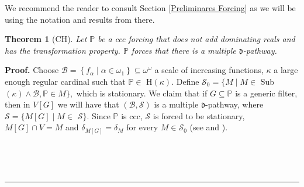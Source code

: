 \documentclass{article}%
\newtheorem{theorem}{Theorem}
\newenvironment{proof}[1][Proof]{\noindent\textbf{#1.} }{\ \rule{0.5em}{0.5em}}
\begin{document}
We recommend the reader to consult Section \ref{Preliminares Forcing} as we
will be using the notation and results from there.

\begin{theorem}
[\textsf{CH}]Let $\mathbb{P}$ be a ccc forcing that does not add dominating
reals and has the transformation property. $\mathbb{P}$ forces that there is a
multiple $\mathfrak{d}$-pathway.
\end{theorem}

\begin{proof}
Choose $\mathcal{B}=\left\{  f_{\alpha}\mid\alpha\in\omega_{1}\right\}
\subseteq\omega^{\omega}$ a scale of increasing functions, $\kappa$ a large
enough regular cardinal such that $\mathbb{P\in}$ \textsf{H}$\left(
\kappa\right)  .$ Define $\mathcal{S}_{0}=\{M\mid M\in$ \textsf{Sub}$\left(
\kappa\right)  \wedge\mathcal{B},\mathbb{P}\in M\},$ which is stationary. We
claim that if $G\subseteq\mathbb{P}$ is a generic filter, then in $V\left[
G\right]  $ we will have that $\left(  \mathcal{B},\mathcal{S}\right)  $ is a
multiple $\mathfrak{d}$-pathway, where $\mathcal{S}=\{M\left[  G\right]  \mid
M\in$ $\mathcal{S}\}.$ Since $\mathbb{P}$ is ccc, $\mathcal{S}$ is forced to
be stationary, $M\left[  G\right]  \cap V=M$ and $\delta_{M\left[  G\right]
}=\delta_{M}$ for every $M\in\mathcal{S}_{0}$ (see \cite{ProperandImproper}
and \cite{NotesonForcingAxioms}).

\qquad\qquad\qquad\ \ \ 


\end{proof}
\end{document}

